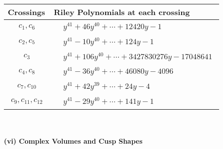\documentclass[1p]{elsarticle_modified}
\theoremstyle{definition}
\begin{document}
\begin{tabular}{m{50pt}|m{274pt}}
Crossings & \hspace{64pt}Riley Polynomials at each crossing \\
\hline $$\begin{aligned}c_{1},c_{6}\end{aligned}$$&$\begin{aligned}
&y^{41}+46 y^{40}+\cdots+12420 y-1
\end{aligned}$\\
\hline $$\begin{aligned}c_{2},c_{5}\end{aligned}$$&$\begin{aligned}
&y^{41}-10 y^{40}+\cdots+124 y-1
\end{aligned}$\\
\hline $$\begin{aligned}c_{3}\end{aligned}$$&$\begin{aligned}
&y^{41}+106 y^{40}+\cdots+3427830276 y-17048641
\end{aligned}$\\
\hline $$\begin{aligned}c_{4},c_{8}\end{aligned}$$&$\begin{aligned}
&y^{41}-36 y^{40}+\cdots+46080 y-4096
\end{aligned}$\\
\hline $$\begin{aligned}c_{7},c_{10}\end{aligned}$$&$\begin{aligned}
&y^{41}+42 y^{39}+\cdots+24 y-4
\end{aligned}$\\
\hline $$\begin{aligned}c_{9},c_{11},c_{12}\end{aligned}$$&$\begin{aligned}
&y^{41}-29 y^{40}+\cdots+141 y-1
\end{aligned}$\\
\hline
\end{tabular}\\~\\
\newpage\flushleft \textbf{(vi) Complex Volumes and Cusp Shapes}
\end{document}
